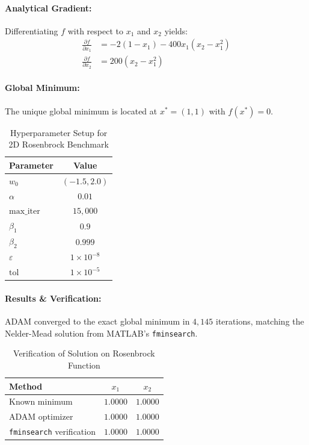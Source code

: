 \documentclass[11pt,a4paper]{article}
\begin{document}
\paragraph{Analytical Gradient:}
Differentiating $f$ with respect to $x_1$ and $x_2$ yields:
\begin{align}
    \frac{\partial f}{\partial x_1} &= -2(1 - x_1) - 400x_1(x_2 - x_1^2) \\
    \frac{\partial f}{\partial x_2} &= 200(x_2 - x_1^2)
\end{align}

\paragraph{Global Minimum:}
The unique global minimum is located at $x^* = (1, 1)$ with $f(x^*) = 0$.

\begin{table}[H]
\centering
\caption{Hyperparameter Setup for 2D Rosenbrock Benchmark}\label{tab:rosenbrock_params}
\begin{tabular}{lc}
\toprule
\textbf{Parameter} & \textbf{Value} \\
\midrule
$w_0$ & $(-1.5, 2.0)$ \\
$\alpha$ & $0.01$ \\
$\text{max\_iter}$ & $15{,}000$ \\
$\beta_1$ & $0.9$ \\
$\beta_2$ & $0.999$ \\
$\varepsilon$ & $1 \times 10^{-8}$ \\
$\text{tol}$ & $1 \times 10^{-5}$ \\
\bottomrule
\end{tabular}
\end{table}

\paragraph{Results \& Verification:}
ADAM converged to the exact global minimum in $4{,}145$ iterations, matching the Nelder-Mead solution from MATLAB's \texttt{fminsearch}.

\begin{table}[H]
\centering
\caption{Verification of Solution on Rosenbrock Function}\label{tab:rosenbrock_verif}
\begin{tabular}{lcc}
\toprule
\textbf{Method} & $x_1$ & $x_2$ \\
\midrule
Known minimum & $1.0000$ & $1.0000$ \\
ADAM optimizer & $1.0000$ & $1.0000$ \\
\texttt{fminsearch} verification & $1.0000$ & $1.0000$ \\
\bottomrule
\end{tabular}
\end{table}
\end{document}
